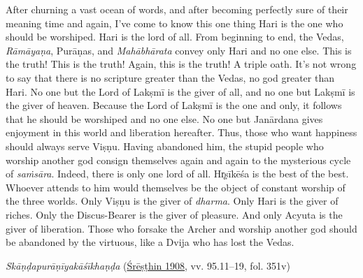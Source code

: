 \begin{pullquote}
After churning a vast ocean of words, and after becoming perfectly sure of their meaning time and again, I’ve come to know this one thing  \Dash  Hari is the one who should be worshiped. Hari is the lord of all. From beginning to end, the Vedas, \emph{Rāmāyaṇa}, Purāṇas, and \emph{Mahābhārata} convey only Hari and no one else. This is the truth! This is the truth! Again, this is the truth! A triple oath. It’s not wrong to say that there is no scripture greater than the Vedas, no god greater than Hari. No one but the Lord of Lakṣmī is the giver of all, and no one but Lakṣmī is the giver of heaven. Because the Lord of Lakṣmī is the one and only, it follows that he should be worshiped and no one else. No one but Janārdana gives enjoyment in this world and liberation hereafter. Thus, those who want happiness should always serve Viṣṇu. Having abandoned him, the stupid people who worship another god consign themselves again and again to the mysterious cycle of \emph{saṁsāra}. Indeed, there is only one lord of all. Hr̥ṣīkēśa is the best of the best. Whoever attends to him would themselves be the object of constant worship of the three worlds. Only Viṣṇu is the giver of \emph{dharma}. Only Hari is the giver of riches. Only the Discus-Bearer is the giver of pleasure. And only Acyuta is the giver of liberation. Those who forsake the Archer and worship another god should be abandoned by the virtuous, like a Dvija who has lost the Vedas.


\medskip\hfill\begin{minipage}{0.9\textwidth}\small\hfill
\emph{{Skāṇḍapurāṇīyakāśīkhaṇḍa}} (\hyperref[Kasikhanda1908]{Śrēṣṭhin 1908}, vv. 95.11–19, fol. 351v)\end{minipage}\hspace{2em}
\end{pullquote}

